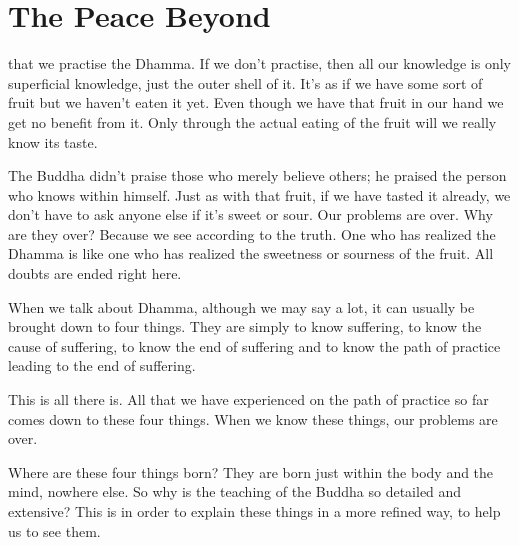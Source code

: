 
\chapter{The Peace Beyond}

 that we practise the Dhamma. If we don't practise, then all our knowledge is only superficial knowledge, just the outer shell of it. It's as if we have some sort of fruit but we haven't eaten it yet. Even though we have that fruit in our hand we get no benefit from it. Only through the actual eating of the fruit will we really know its taste.

The Buddha didn't praise those who merely believe others; he praised the person who knows within himself. Just as with that fruit, if we have tasted it already, we don't have to ask anyone else if it's sweet or sour. Our problems are over. Why are they over? Because we see according to the truth. One who has realized the Dhamma is like one who has realized the sweetness or sourness of the fruit. All doubts are ended right here. 

When we talk about Dhamma, although we may say a lot, it can usually be brought down to four things. They are simply to know suffering, to know the cause of suffering, to know the end of suffering and to know the path of practice leading to the end of suffering. 

This is all there is. All that we have experienced on the path of practice so far comes down to these four things. When we know these things, our problems are over. 

Where are these four things born? They are born just within the body and the mind, nowhere else. So why is the teaching of the Buddha so detailed and extensive? This is in order to explain these things in a more refined way, to help us to see them. 


